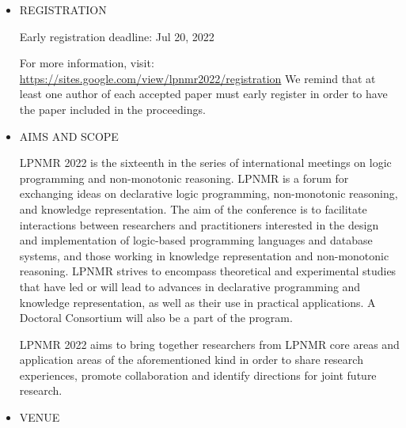 \documentclass[prodmode,acmtecs]{acmsmall} %
\begin{document}
\begin{itemize}\item  REGISTRATION  
 
Early registration deadline: Jul 20, 2022 
 
  For more information, visit: \href{https://sites.google.com/view/lpnmr2022/registration}{https://sites.google.com/view/lpnmr2022/registration}  We remind that at least one author of each accepted paper must early register in order to have the paper included in the proceedings. 
 
\item  AIMS AND SCOPE 
 
  LPNMR 2022 is the sixteenth in the series of international meetings on logic programming and non-monotonic reasoning. LPNMR is a forum for exchanging ideas on declarative logic programming, non-monotonic reasoning, and knowledge representation. The aim of the conference is to facilitate interactions between researchers and practitioners interested in the design and implementation of logic-based programming languages and database systems, and those working in knowledge representation and non-monotonic reasoning. LPNMR strives to encompass theoretical and experimental studies that have led or will lead to advances in declarative programming and knowledge representation, as well as their use in practical applications. A Doctoral Consortium will also be a part of the program. 
 
  LPNMR 2022 aims to bring together researchers from LPNMR core areas and application areas of the aforementioned kind in order to share research experiences, promote collaboration and identify directions for joint future research.  
 
\item  VENUE 
 

\end{itemize}
\end{document}
